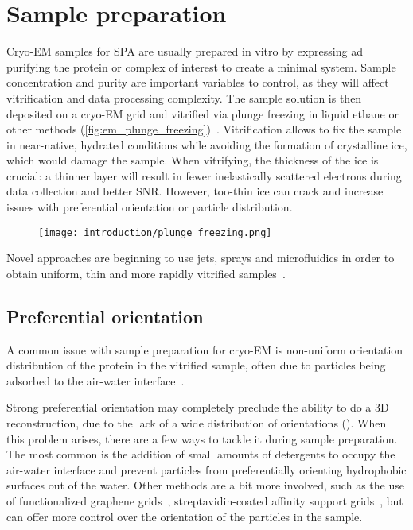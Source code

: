 \section{Sample preparation}\label{em_sample_prep}
Cryo-EM samples for SPA are usually prepared in vitro by expressing ad purifying the protein or complex of interest to create a minimal system.
Sample concentration and purity are important variables to control, as they will affect vitrification and data processing complexity.
The sample solution is then deposited on a cryo-EM grid and vitrified via plunge freezing in liquid ethane or other methods (\autoref{fig:em_plunge_freezing})~\cite{dubochetCryoelectronMicroscopyVitrified1988}.
Vitrification allows to fix the sample in near-native, hydrated conditions while avoiding the formation of crystalline ice, which would damage the sample.
When vitrifying, the thickness of the ice is crucial: a thinner layer will result in fewer inelastically scattered electrons during data collection and better SNR.
However, too-thin ice can crack and increase issues with preferential orientation or particle distribution.

\begin{figure}[ht]
    \centering
    \texttt{[image: introduction/plunge\_freezing.png]}
    \label{fig:em_plunge_freezing}
\end{figure}

Novel approaches are beginning to use jets, sprays and microfluidics in order to obtain uniform, thin and more rapidly vitrified samples~\cite{geminEasyGridVersatilePlatform2024}.

\subsection{Preferential orientation}\label{em_pref_ori}
A common issue with sample preparation for cryo-EM is non-uniform orientation distribution of the protein in the vitrified sample, often due to particles being adsorbed to the air-water interface~\cite{nobleRoutineSingleParticle2018}.

Strong preferential orientation may completely preclude the ability to do a 3D reconstruction, due to the lack of a wide distribution of orientations ().
When this problem arises, there are a few ways to tackle it during sample preparation.
The most common is the addition of small amounts of detergents to occupy the air-water interface and prevent particles from preferentially orienting hydrophobic surfaces out of the water.
Other methods are a bit more involved, such as the use of functionalized graphene grids~\cite{luFunctionalizedGrapheneGrids2022}, streptavidin-coated affinity support grids~\cite{crucifixImmobilizationBiotinylatedDNA2004,hanLongShelflifeStreptavidin2016}, but can offer more control over the orientation of the particles in the sample.

